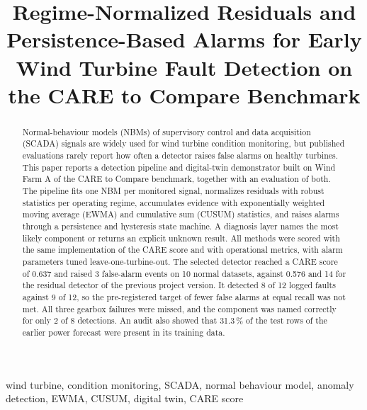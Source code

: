 \documentclass[conference]{IEEEtran}
\begin{document}
\title{Regime-Normalized Residuals and Persistence-Based Alarms for Early Wind Turbine Fault Detection on the CARE to Compare Benchmark}

\author{
}

\maketitle

\begin{abstract}
Normal-behaviour models (NBMs) of supervisory control and data acquisition (SCADA) signals are widely used for wind turbine condition monitoring, but published evaluations rarely report how often a detector raises false alarms on healthy turbines. This paper reports a detection pipeline and digital-twin demonstrator built on Wind Farm A of the CARE to Compare benchmark, together with an evaluation of both. The pipeline fits one NBM per monitored signal, normalizes residuals with robust statistics per operating regime, accumulates evidence with exponentially weighted moving average (EWMA) and cumulative sum (CUSUM) statistics, and raises alarms through a persistence and hysteresis state machine. A diagnosis layer names the most likely component or returns an explicit unknown result. All methods were scored with the same implementation of the CARE score and with operational metrics, with alarm parameters tuned leave-one-turbine-out. The selected detector reached a CARE score of 0.637 and raised 3 false-alarm events on 10 normal datasets, against 0.576 and 14 for the residual detector of the previous project version. It detected 8 of 12 logged faults against 9 of 12, so the pre-registered target of fewer false alarms at equal recall was not met. All three gearbox failures were missed, and the component was named correctly for only 2 of 8 detections. An audit also showed that 31.3\,\% of the test rows of the earlier power forecast were present in its training data.
\end{abstract}

\begin{IEEEkeywords}
wind turbine, condition monitoring, SCADA, normal behaviour model, anomaly detection, EWMA, CUSUM, digital twin, CARE score
\end{IEEEkeywords}
\end{document}
